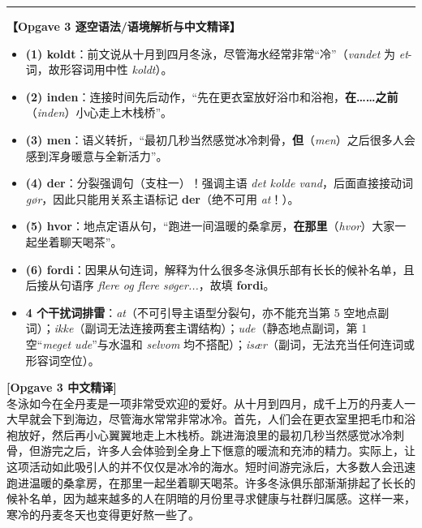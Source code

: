 \begin{answerbox}
\vspace{0.45em}
\hrule
\vspace{0.45em}
\textbf{\color{NCDNavy}【Opgave 3 逐空语法/语境解析与中文精译】}
\begin{itemize}
  \item \textbf{(1) koldt}：前文说从十月到四月冬泳，尽管海水经常非常“冷”（\textit{vandet} 为 \textit{et}-词，故形容词用中性 \textit{koldt}）。
  \item \textbf{(2) inden}：连接时间先后动作，“先在更衣室放好浴巾和浴袍，\textbf{在……之前}（\textit{inden}）小心走上木栈桥”。
  \item \textbf{(3) men}：语义转折，“最初几秒当然感觉冰冷刺骨，\textbf{但}（\textit{men}）之后很多人会感到浑身暖意与全新活力”。
  \item \textbf{(4) der}：分裂强调句（支柱一）！强调主语 \textit{det kolde vand}，后面直接接动词 \textit{gør}，因此只能用关系主语标记 \textbf{der}（绝不可用 \textit{at}！）。
  \item \textbf{(5) hvor}：地点定语从句，“跑进一间温暖的桑拿房，\textbf{在那里}（\textit{hvor}）大家一起坐着聊天喝茶”。
  \item \textbf{(6) fordi}：因果从句连词，解释为什么很多冬泳俱乐部有长长的候补名单，且后接从句语序 \textit{flere og flere søger...}，故填 \textbf{fordi}。
  \item \textbf{4 个干扰词排雷}：\textit{at}（不可引导主语型分裂句，亦不能充当第 5 空地点副词）；\textit{ikke}（副词无法连接两套主谓结构）；\textit{ude}（静态地点副词，第 1 空“\textit{meget ude}”与水温和 \textit{selvom} 均不搭配）；\textit{især}（副词，无法充当任何连词或形容词空位）。
\end{itemize}

\textbf{\color{NCDTeal}[Opgave 3 中文精译]}\\
冬泳如今在全丹麦是一项非常受欢迎的爱好。从十月到四月，成千上万的丹麦人一大早就会下到海边，尽管海水常常非常冰冷。首先，人们会在更衣室里把毛巾和浴袍放好，然后再小心翼翼地走上木栈桥。跳进海浪里的最初几秒当然感觉冰冷刺骨，但游完之后，许多人会体验到全身上下惬意的暖流和充沛的精力。实际上，让这项活动如此吸引人的并不仅仅是冰冷的海水。短时间游完泳后，大多数人会迅速跑进温暖的桑拿房，在那里一起坐着聊天喝茶。许多冬泳俱乐部渐渐排起了长长的候补名单，因为越来越多的人在阴暗的月份里寻求健康与社群归属感。这样一来，寒冷的丹麦冬天也变得更好熬一些了。


\end{answerbox}
